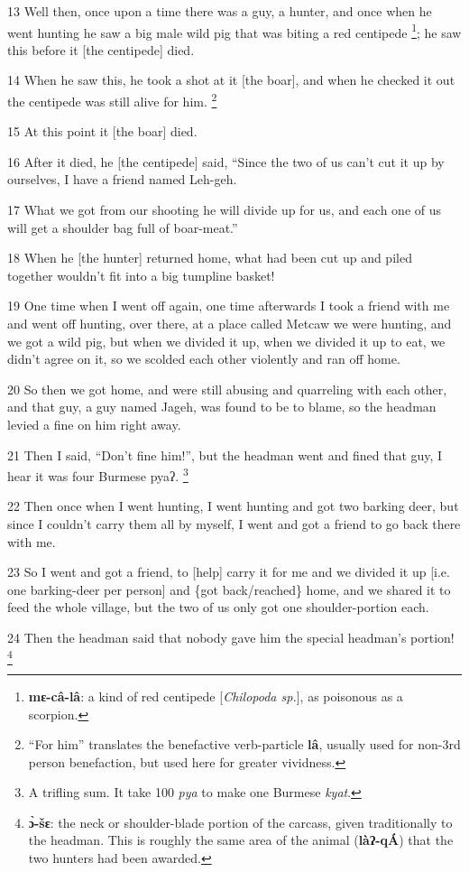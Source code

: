 13 Well then, once upon a time there was a guy, a hunter, and once when he went
hunting he saw a big male wild pig that was biting a red centipede \footnote{\textbf{mɛ-câ-lâ}: a kind of red centipede [\textit{Chilopoda sp.}], as poisonous as a scorpion.}; he saw
this before it [the centipede] died.

14 When he saw this, he took a shot at it [the boar], and when he checked it out
the centipede was still alive for him. \footnote{``For him'' translates the benefactive verb-particle \textbf{lâ}, usually used for non-3rd person benefaction, but used here for greater vividness.}

15 At this point it [the boar] died.

16 After it died, he [the centipede] said, ``Since the two of us can't cut it up
by ourselves, I have a friend named Leh-geh.

17 What we got from our shooting he will divide up for us, and each one of us will
get a shoulder bag full of boar-meat.''

18 When he [the hunter] returned home, what had been cut up and piled together
wouldn't fit into a big tumpline basket!

19 One time when I went off again, one time afterwards I took a friend with me
and went off hunting, over there, at a place called Metcaw we were hunting, and
we got a wild pig, but when we divided it up, when we divided it up to eat, we
didn't agree on it, so we scolded each other violently and ran off home.

20 So then we got home, and were still abusing and quarreling with each other,
and that guy, a guy named Jageh, was found to be to blame, so the headman levied
a fine on him right away.

21 Then I said, ``Don't fine him!'', but the headman went and fined that guy, I
hear it was four Burmese pyaʔ. \footnote{A trifling sum. It take 100 \textit{pya} to make one Burmese \textit{kyat}.}

22 Then once when I went hunting, I went hunting and got two barking deer, but
since I couldn't carry them all by myself, I went and got a friend to go back there
with me.

23 So I went and got a friend, to [help] carry it for me and we divided it up [i.e.
one barking-deer per person] and \{got back/reached\} home, and we shared it to
feed the whole village, but the two of us only got one shoulder-portion each.

24 Then the headman said that nobody gave him the special headman's portion! \footnote{\textbf{ɔ̀-šɛ}: the neck or shoulder-blade portion of the carcass, given traditionally to the headman. This is roughly the same area of the animal (\textbf{làʔ-qÁ}) that the two hunters had been awarded.}

